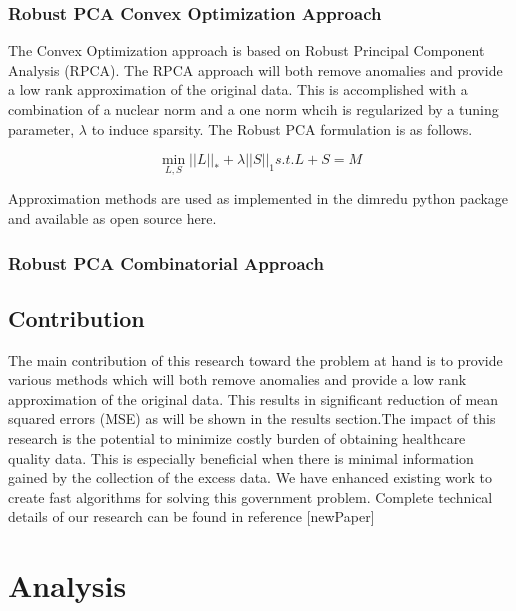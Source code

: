 \documentclass{article}
\begin{document}
\subsubsection{Robust PCA Convex Optimization Approach}
The Convex Optimization approach is based on Robust Principal Component Analysis (RPCA).  The RPCA approach will both remove anomalies and provide a low rank approximation of the original data. This is accomplished with a combination of a nuclear norm and a one norm whcih is regularized by a tuning parameter, $\lambda$ to induce sparsity. The Robust PCA formulation is as follows.

\begin{equation}
\min_{L,S} ||L||_* + \lambda ||S||_1    s.t. L + S = M
\label{RPCA}
\end{equation}

Approximation methods are used as implemented in the dimredu python package and available as open source here.
 
\subsubsection{Robust PCA Combinatorial Approach}

\subsection{Contribution}
The main contribution of this research toward the problem at hand is to provide various methods which will both remove anomalies and provide a low rank approximation of the original data.  This results in significant reduction of mean squared errors (MSE) as will be shown in the results section.The impact of this research is the potential to minimize costly burden of obtaining healthcare quality data. This is especially beneficial when there is minimal information gained by the collection of the excess data. We have enhanced existing work to create fast algorithms for solving this government problem. Complete technical details of our research can be found in reference [newPaper]
\section{Analysis}
\end{document}

